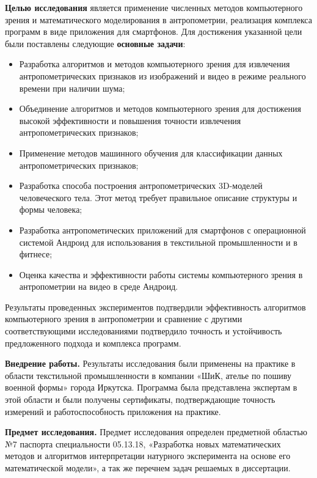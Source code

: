 \textbf{Целью исследования} является применение численных методов компьютерного зрения и математического моделирования в антропометрии, реализация комплекса программ в виде приложения для смартфонов. Для достижения указанной цели были поставлены следующие \textbf {основные задачи}:
\begin{itemize}
	\item Разработка алгоритмов и методов компьютерного зрения для извлечения антропометрических признаков из изображений и видео в режиме реального времени при наличии шума;
	\item Объединение алгоритмов и методов компьютерного зрения для достижения высокой эффективности и повышения точности извлечения антропометрических признаков;
	\item Применение методов машинного обучения для классификации данных антропометрических признаков;
	\item Разработка способа построения антропометрических 3D-моделей человеческого тела. Этот метод требует правильное описание структуры и формы человека;
	\item Разработка антропометических приложений для смартфонов с операционной системой Андроид для использования в текстильной промышленности и в фитнесе;
	\item Оценка качества и эффективности работы системы компьютерного зрения в антропометрии на видео в среде Андроид.
\end{itemize}
Результаты проведенных экспериментов подтвердили эффективность алгоритмов компьютерного зрения в антропометрии и сравнение с другими соответствующими исследованиями подтвердило точность и устойчивость предложенного подхода и комплекса программ. 

\textbf{Внедрение работы.} Результаты исследования были применены на практике в области текстильной промышленности в компании «ШиК, ателье по пошиву военной формы» города Иркутска. Программа была представлена экспертам в этой области и были получены сертификаты, подтверждающие точность измерений и работоспособность приложения на практике.

\textbf{Предмет исследования.} Предмет исследования определен предметной областью №7 паспорта специальности 05.13.18, «Разработка новых математических методов и алгоритмов интерпретации натурного эксперимента на основе его математической модели», а так же перечнем задач решаемых в диссертации.

